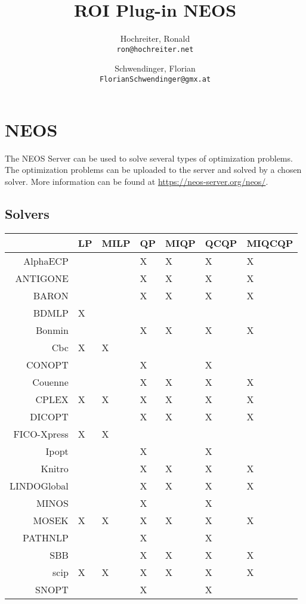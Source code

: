 \documentclass[a4paper]{article}\usepackage[]{graphicx}\usepackage[]{color}
\author{
    Hochreiter, Ronald\\
    \texttt{ron@hochreiter.net}
    \and 
    Schwendinger, Florian\\
    \texttt{FlorianSchwendinger@gmx.at}
}
\title{ROI Plug-in NEOS}
\begin{document}
\sloppy
\maketitle


\tableofcontents

\newpage

\section{NEOS}
The NEOS Server can be used to solve several types of optimization problems.
The optimization problems can be uploaded to the server and solved 
by a chosen solver. More information can be found at 
\url{https://neos-server.org/neos/}.

\subsection{Solvers}
\begin{center}
\begin{table}[ht]
\centering
\begin{tabular}{rllllll}
  \hline
 & LP & MILP & QP & MIQP & QCQP & MIQCQP \\ 
  \hline
AlphaECP &  &  & X & X & X & X \\ 
  ANTIGONE &  &  & X & X & X & X \\ 
  BARON &  &  & X & X & X & X \\ 
  BDMLP & X &  &  &  &  &  \\ 
  Bonmin &  &  & X & X & X & X \\ 
  Cbc & X & X &  &  &  &  \\ 
  CONOPT &  &  & X &  & X &  \\ 
  Couenne &  &  & X & X & X & X \\ 
  CPLEX & X & X & X & X & X & X \\ 
  DICOPT &  &  & X & X & X & X \\ 
  FICO-Xpress & X & X &  &  &  &  \\ 
  Ipopt &  &  & X &  & X &  \\ 
  Knitro &  &  & X & X & X & X \\ 
  LINDOGlobal &  &  & X & X & X & X \\ 
  MINOS &  &  & X &  & X &  \\ 
  MOSEK & X & X & X & X & X & X \\ 
  PATHNLP &  &  & X &  & X &  \\ 
  SBB &  &  & X & X & X & X \\ 
  scip & X & X & X & X & X & X \\ 
  SNOPT &  &  & X &  & X &  \\ 
   \hline
\end{tabular}
\end{table}

\end{center}
\end{document}
